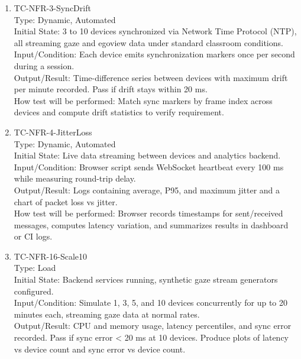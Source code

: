 \documentclass[12pt, titlepage]{article}
\begin{document}
\begin{enumerate}
\item{TC-NFR-3-SyncDrift\\}
Type: Dynamic, Automated\\

Initial State: 3 to 10 devices synchronized via Network Time Protocol (NTP), all streaming gaze and egoview data under standard classroom conditions.\\

Input/Condition: Each device emits synchronization markers once per second during a session.\\

Output/Result: Time-difference series between devices with maximum drift per minute recorded. Pass if drift stays within 20 ms.\\

How test will be performed: Match sync markers by frame index across devices and compute drift statistics to verify requirement.

\item{TC-NFR-4-JitterLoss\\}
Type: Dynamic, Automated\\

Initial State: Live data streaming between devices and analytics backend.\\

Input/Condition: Browser script sends WebSocket heartbeat every 100 ms while measuring round-trip delay.\\

Output/Result: Logs containing average, P95, and maximum jitter and a chart of packet loss vs jitter.\\

How test will be performed: Browser records timestamps for sent/received messages, computes latency variation, and summarizes results in dashboard or CI logs.

\item{TC-NFR-16-Scale10\\}
Type: Load\\

Initial State: Backend services running, synthetic gaze stream generators configured.\\

Input/Condition: Simulate 1, 3, 5, and 10 devices concurrently for up to 20 minutes each, streaming gaze data at normal rates.\\

Output/Result: CPU and memory usage, latency percentiles, and sync error recorded. Pass if sync error < 20 ms at 10 devices. Produce plots of latency vs device count and sync error vs device count.\\


\end{enumerate}
\end{document}
